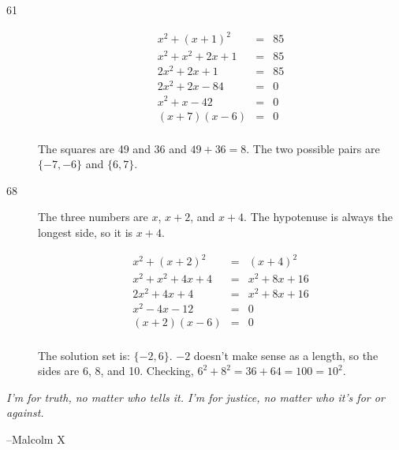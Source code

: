 \documentclass[fleqn,addpoints]{exam}
\begin{document}
\begin{description}
\item[61]
\begin{eqnarray*}
  x^2 + (x + 1)^2 &=& 85 \\
  x^2 + x^2 + 2x + 1 &=& 85 \\
  2x^2 + 2x + 1 &=& 85 \\
  2x^2 + 2x - 84 &=& 0 \\
  x^2 + x - 42 &=& 0 \\
  (x + 7)(x - 6) &=& 0 \\
\end{eqnarray*}

The squares are 49 and 36 and $49 + 36 = 8$.  The two possible pairs are $\{-7, -6\}$ and $\{6, 7\}$.

\item[68]

The three numbers are $x$, $x+2$, and $x + 4$.  The hypotenuse is always the longest side, so it is $x + 4$.

\begin{eqnarray*}
  x^2 + (x + 2)^2 &=& (x + 4)^2 \\
  x^2 + x^2 + 4x + 4 &=& x^2 + 8x + 16 \\
  2x^2 + 4x + 4 &=& x^2 + 8x + 16 \\
  x^2 - 4x - 12 &=& 0 \\
  (x + 2)(x - 6) &=& 0 \\
\end{eqnarray*}

The solution set is: $\{-2, 6\}$.  $-2$ doesn't make sense as a length, so the sides are 6, 8, and 10.  Checking, 
$6^2 + 8^2 = 36 + 64 = 100 = 10^2$.

\end{description}




\else
\vspace{9 cm}
{\em I'm for truth, no matter who tells it. I'm for justice, no matter who it's for or against.}

\vspace{0.1 in}

\hspace{0.5 in} --Malcolm X

\fi
\end{document}
